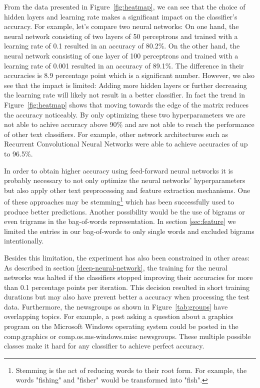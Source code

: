 \documentclass[sigconf]{acmart}
\begin{document}
From the data presented in Figure~\ref{fig:heatmap}, we can see that the choice of hidden layers and learning rate makes a significant impact on the classifier's accuracy. For example, let's compare two neural networks: On one hand, the neural network consisting of two layers of 50 perceptrons and trained with a learning rate of 0.1 resulted in an accuracy of 80.2\%. On the other hand, the neural network consisting of one layer of 100 perceptrons and trained with a learning rate of 0.001 resulted in an accuracy of 89.1\%. The difference in their accuracies is 8.9 percentage point which is a significant number.
However, we also see that the impact is limited: Adding more hidden layers or further decreasing the learning rate will likely not result in a better classifier. In fact the trend in Figure~\ref{fig:heatmap} shows that moving towards the edge of the matrix reduces the accuracy noticeably. By only optimizing these two hyperparameters we are not able to achive accuracy above 90\% and are not able to reach the performance of other text classifiers. For example, other network architectures such as Recurrent Convolutional Neural Networks were able to achieve accuracies of up to 96.5\%\cite{rcnn}.

In order to obtain higher accuracy using feed-forward neural networks it is probably necessary to not only optimize the neural networks' hyperparameters but also apply other text preprocessing and feature extraction mechanisms. One of these approaches may be stemming\footnote{Stemming is the act of reducing words to their root form. For example, the words "fishing" and "fisher" would be transformed into "fish".} which has been successfully used to produce better predictions\cite{stemming}. Another possibility would be the use of bigrams or even trigrams in the bag-of-words representation. In section \ref{sec:feature} we limited the entries in our bag-of-words to only single words and excluded bigrams intentionally.

Besides this limitation, the experiment has also been constrained in other areas: As described in section \ref{deep-neural-network}, the training for the neural networks was halted if the classifiers stopped improving their accuracies for more than 0.1 percentage points per iteration. This decision resulted in short training durations but may also have prevent better a accuracy when processing the test data.
Furthermore, the newsgroups as shown in Figure~\ref{tab:groups} have overlapping topics. For example, a post asking a question about a graphics program on the Microsoft Windows operating system could be posted in the comp.graphics or comp.os.ms-windows.misc newsgroups. These multiple possible classes make it hard for any classifier to achieve perfect accuracy.
\end{document}
